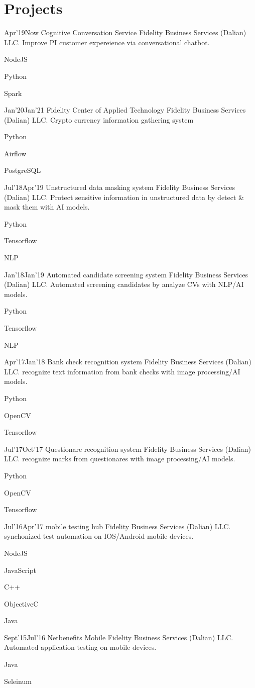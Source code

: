 \documentclass[]{lubricy-cv}
\begin{document}
\section{Projects}
\begin{entrylist}
  \entry
    {Apr'19}{Now}
    {Cognitive Conversation Service}
    {Fidelity Business Services (Dalian) LLC.}
    {Improve PI customer expereience via conversational chatbot.}
    {
      \item NodeJS
      \item Python
      \item Spark }
    {Jan'20}{Jan'21}
    {Fidelity Center of Applied Technology}
    {Fidelity Business Services (Dalian) LLC.}
    {Crypto currency information gathering system}
    {
      \item Python
      \item Airflow
      \item PostgreSQL }
  \entry
    {Jul'18}{Apr'19}
    {Unstructured data masking system}
    {Fidelity Business Services (Dalian) LLC.}
    {Protect sensitive information in unstructured data by detect \& mask them with AI models.}
    {
      \item Python
      \item Tensorflow
      \item NLP }
  \entry
    {Jan'18}{Jan'19}
    {Automated candidate screening system}
    {Fidelity Business Services (Dalian) LLC.}
    {Automated screening candidates by analyze CVs with NLP/AI models.}
    {
      \item Python
      \item Tensorflow
      \item NLP}
  \entry
    {Apr'17}{Jan'18}
    {Bank check recognition system}
    {Fidelity Business Services (Dalian) LLC.}
    {recognize text information from bank checks with image processing/AI models.}
    {
      \item Python
      \item OpenCV
      \item Tensorflow}
  \entry
    {Jul'17}{Oct'17}
    {Questionare recognition system}
    {Fidelity Business Services (Dalian) LLC.}
    {recognize marks from questionares with image processing/AI models.}
    {
      \item Python
      \item OpenCV
      \item Tensorflow}
  \entry
    {Jul'16}{Apr'17}
    {mobile testing hub}
    {Fidelity Business Services (Dalian) LLC.}
    {synchonized test automation on IOS/Android mobile devices.}
    {
      \item NodeJS
      \item JavaScript
      \item C++
      \item ObjectiveC
      \item Java}
  \entry
    {Sept'15}{Jul'16}
    {Netbenefits Mobile}
    {Fidelity Business Services (Dalian) LLC.}
    {Automated application testing on mobile devices.}
    {
      \item Java
      \item Seleinum}
\end{entrylist}
~
\end{document}
